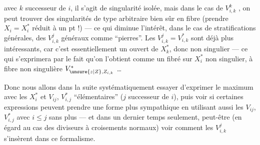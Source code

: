 avec $k$ successeur de $i$, il s'agit de singularité isolée, mais dans le cas de $V_{i,k}^k$ , on peut trouver des singularités de type arbitraire bien sûr en fibre (prendre $X_i=X_i^*$ réduit à un pt !) — ce qui diminue l'intérêt, dans le cas de stratifications  générales, des $V_{i,k}^j$ généraux comme ``pierres''. Les $V_{i,k}^{j}=V_{i,k}^*$ sont déjà plus intéressants, car  c'est essentiellement un  ouvert de $X_k^*$, donc non singulier — ce qui s'exprimera par le fait qu'on l'obtient comme un fibré sur $X_i^*$ non singulier, à fibre non singulière $V_{\unsure{z|Z},Z_{i,k}}^*$ \ldots

Donc nous allons dans la suite systématiquement essayer d'exprimer le maximum avec les $X_i^*$ et  $V_{ij}$, $V_{i,j}^*$ ``élémentaires'' ($j$ successeur de $i$), puis voir si certaines expressions peuvent prendre une forme plus sympathique en utilisant aussi  les $V_{ij}$, $V_{i,j}^*$ avec $i\leq j$ sans plus — et dans un dernier temps seulement, peut-être (en égard au cas des diviseurs à croisements normaux) voir comment les $V_{i,k}^j$ s'insèrent dans ce formalisme.
